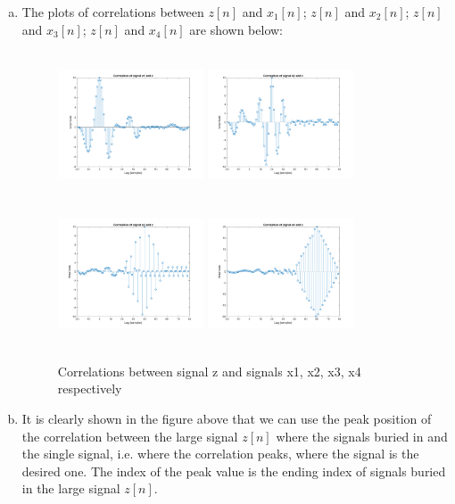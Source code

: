 \documentclass[a4paper]{article}
\begin{document}
\begin{spacing}{2.0}
\begin{enumerate}[(a)]
\item The plots of correlations between $z[n]$ and $x_1[n]$; $z[n]$ and $x_2[n]$; $z[n]$ and $x_3[n]$; $z[n]$ and $x_4[n]$ are shown below:

\begin{figure}[H]
\centering
\includegraphics[width=1.7in,height=1.7in]{crossx1.png}
\includegraphics[width=1.7in,height=1.7in]{crossx2.png}
\includegraphics[width=1.7in,height=1.7in]{crossx3.png}
\includegraphics[width=1.7in,height=1.7in]{crossx4.png}
\caption{Correlations between signal z and signals x1, x2, x3, x4 respectively }
\label{fig:graph}
\end{figure}

\item It is clearly shown in the figure above that we can use the peak position of the correlation between the large signal $z[n]$ where the signals buried in and the single signal, i.e. where the correlation peaks, where the signal is the desired one. The index of the peak value is the ending index of signals buried in the large signal $z[n]$.


\end{enumerate}
\end{spacing}
\end{document}
